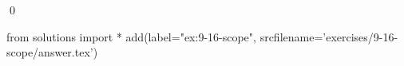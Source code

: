 
\begin{ex}
  \label{ex:9-16-scope}
  
  \qed
\end{ex}
\begin{python0}
from solutions import *
add(label="ex:9-16-scope",
    srcfilename='exercises/9-16-scope/answer.tex')
\end{python0}
